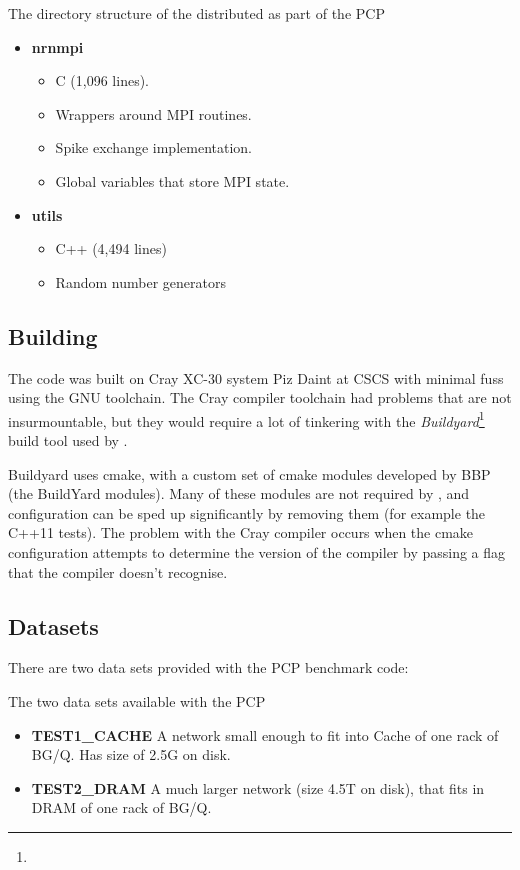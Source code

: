 \begin{infobox}{The directory structure of the \neuron distributed as part of the PCP}
\begin{itemize}[leftmargin=*]
    \item \textbf{nrnmpi}
    \begin{itemize}
        \item C (1,096 lines).
        \item Wrappers around MPI routines.
        \item Spike exchange implementation.
        \item Global variables that store MPI state.
    \end{itemize}

    \item \textbf{utils}
    \begin{itemize}
        \item C++ (4,494 lines)
        \item Random number generators
    \end{itemize}
\end{itemize}
\end{infobox}

\subsection{Building}
The code was built on Cray XC-30 system Piz Daint at CSCS with minimal fuss using the GNU toolchain.
The Cray compiler toolchain had problems that are not insurmountable, but they would require a lot of tinkering with the \emph{Buildyard}\footnote{} build tool used by \neuron.

Buildyard uses cmake, with a custom set of cmake modules developed by BBP (the BuildYard modules). Many of these modules are not required by \neuron, and configuration can be sped up significantly by removing them (for example the C++11 tests). The problem with the Cray compiler occurs when the cmake configuration attempts to determine the version of the compiler by passing a flag that the compiler doesn't recognise.

\subsection{Datasets}
There are two data sets provided with the PCP benchmark code:
\begin{infobox}{The two data sets available with the PCP}
\begin{itemize}[leftmargin=*]
    \item \textbf{TEST1\_CACHE} A network small enough to fit into Cache of one rack of BG/Q. Has size of 2.5G on disk.
    \item \textbf{TEST2\_DRAM} A much larger network (size 4.5T on disk), that fits in DRAM of one rack of BG/Q.
\end{itemize}
\end{infobox}


